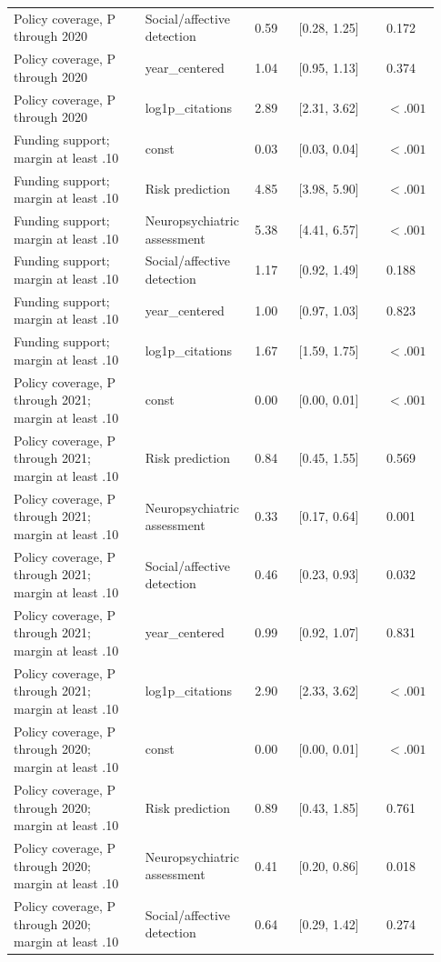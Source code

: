 \documentclass[11pt]{article}
\begin{document}
\begin{longtable}{@{}p{0.3\linewidth}@{\hspace{0.4em}}p{0.25\linewidth}@{\hspace{0.4em}}p{0.1\linewidth}@{\hspace{0.4em}}p{0.2\linewidth}@{\hspace{0.4em}}p{0.08\linewidth}@{}}
Policy coverage, P through 2020 & Social/affective detection & 0.59 & [0.28, 1.25] & 0.172 \\
Policy coverage, P through 2020 & year\_centered & 1.04 & [0.95, 1.13] & 0.374 \\
Policy coverage, P through 2020 & log1p\_citations & 2.89 & [2.31, 3.62] & $<.001$ \\
Funding support; margin at least .10 & const & 0.03 & [0.03, 0.04] & $<.001$ \\
Funding support; margin at least .10 & Risk prediction & 4.85 & [3.98, 5.90] & $<.001$ \\
Funding support; margin at least .10 & Neuropsychiatric assessment & 5.38 & [4.41, 6.57] & $<.001$ \\
Funding support; margin at least .10 & Social/affective detection & 1.17 & [0.92, 1.49] & 0.188 \\
Funding support; margin at least .10 & year\_centered & 1.00 & [0.97, 1.03] & 0.823 \\
Funding support; margin at least .10 & log1p\_citations & 1.67 & [1.59, 1.75] & $<.001$ \\
Policy coverage, P through 2021; margin at least .10 & const & 0.00 & [0.00, 0.01] & $<.001$ \\
Policy coverage, P through 2021; margin at least .10 & Risk prediction & 0.84 & [0.45, 1.55] & 0.569 \\
Policy coverage, P through 2021; margin at least .10 & Neuropsychiatric assessment & 0.33 & [0.17, 0.64] & 0.001 \\
Policy coverage, P through 2021; margin at least .10 & Social/affective detection & 0.46 & [0.23, 0.93] & 0.032 \\
Policy coverage, P through 2021; margin at least .10 & year\_centered & 0.99 & [0.92, 1.07] & 0.831 \\
Policy coverage, P through 2021; margin at least .10 & log1p\_citations & 2.90 & [2.33, 3.62] & $<.001$ \\
Policy coverage, P through 2020; margin at least .10 & const & 0.00 & [0.00, 0.01] & $<.001$ \\
Policy coverage, P through 2020; margin at least .10 & Risk prediction & 0.89 & [0.43, 1.85] & 0.761 \\
Policy coverage, P through 2020; margin at least .10 & Neuropsychiatric assessment & 0.41 & [0.20, 0.86] & 0.018 \\
Policy coverage, P through 2020; margin at least .10 & Social/affective detection & 0.64 & [0.29, 1.42] & 0.274 \\

\end{longtable}
\end{document}
